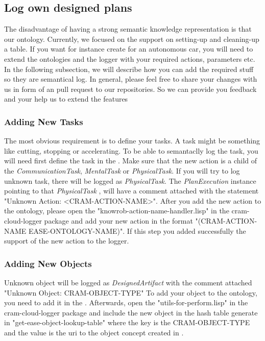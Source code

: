 \subsection{Log own designed plans}
The disadvantage of having a strong semantic knowledge representation is that our ontology.
Currently, we focused on the support on setting-up and cleaning-up a table.
If you want for instance create \neems for an autonomous car, you will need to extend the \ease ontologies and the logger with your required actions, parameters etc.
In the following subsection, we will describe how you can add the required stuff so they are semantical log.
In general, please feel free to share your changes with us in form of an pull request to our repositories.
So we can provide you feedback and your help us to extend the features

\subsubsection{Adding New Tasks}
The most obvious requirement is to define your tasks.
A task might be something like cutting, stopping or accelerating.
To be able to semantaclly log the task, you will need first define the task in the \easeAct.
Make sure that the new action is a child of the \textit{CommunicationTask}, \textit{MentalTask} or \textit{PhysicalTask}.
If you will try to log unknown task, there will be logged as \textit{PhysicalTask}.
The \textit{PlanExecution} instance pointing to that \textit{PhysicalTask} , will have a comment attached with the statement "Unknown Action: <CRAM-ACTION-NAME>".
After you add the new action to the ontology, please open the "knowrob-action-name-handler.lisp" in the cram-cloud-logger package and add your new action in the format "(CRAM-ACTION-NAME EASE-ONTOLOGY-NAME)".
If this step you added successfully the support of the new action to the logger.

\subsubsection{Adding New Objects}
Unknown object will be logged as \textit{DesignedArtifact} with the comment attached "Unknown Object: CRAM-OBJECT-TYPE"
To add your object to the ontology, you need to add it in the \easeObj.
Afterwards, open the "utils-for-perform.lisp" in the 
cram-cloud-logger package and include the new object in the hash table generate in "get-ease-object-lookup-table" where the key is the CRAM-OBJECT-TYPE and the value is the uri to the object concept created in \easeObj.

